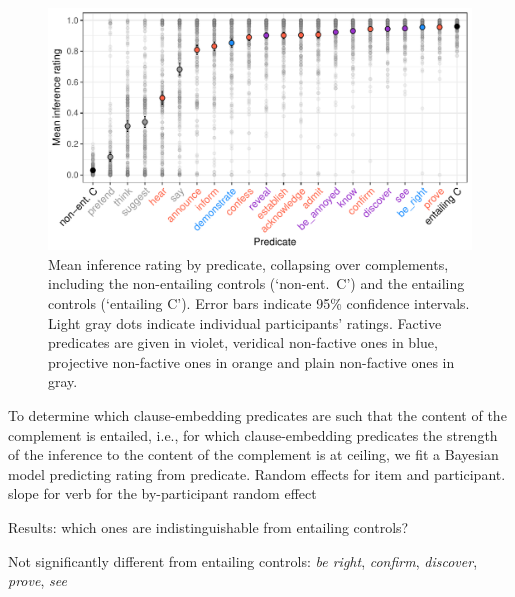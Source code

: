 \documentclass[11pt,fleqn]{article}
\newcommand{\6}{\mbox{$[\hspace*{-.6mm}[$}}
\newcommand{\9}{\mbox{$]\hspace*{-.6mm}]$}}
\begin{document}
\begin{figure}[h!]
\centering

\includegraphics[width=.7\paperwidth]{../results/4-veridicality3/graphs/means-inference-by-predicate-variability}

\caption{Mean inference rating by predicate, collapsing over complements, including the non-entailing controls (`non-ent.\ C') and the entailing controls (`entailing C'). Error bars indicate 95\% confidence intervals. Light gray dots indicate individual participants' ratings. Factive predicates are given in violet, veridical non-factive ones in blue, projective non-factive ones in orange and plain non-factive ones in gray.}
\label{f-veridicality-predicate2}
\end{figure}

To determine which clause-embedding predicates are such that the content of the complement is entailed, i.e., for which clause-embedding predicates the strength of the inference to the content of the complement is at ceiling, we fit a Bayesian model predicting rating from predicate. Random effects for item and participant. slope for verb for the by-participant random effect

Results: which ones are indistinguishable from entailing controls?

Not significantly different from entailing controls: {\em be right}, {\em confirm}, {\em discover}, {\em prove}, {\em see}
\end{document}
